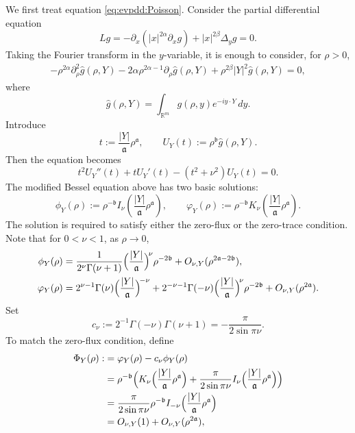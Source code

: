 \documentclass[12pt]{amsart}
\begin{document}
We first treat equation \eqref{eq:evpdd:Poisson}. Consider the partial differential equation
\begin{equation*}
    Lg = -\partial_x (|x|^{2\alpha}\partial_x g) + |x|^{2\beta} \Delta_y g = 0.
\end{equation*}
Taking the Fourier transform in the $y$-variable, it is enough to consider, for $\rho>0$,
\begin{align*}
    - \rho^{2\alpha} \partial_\rho^2 \hat{g}(\rho,Y) - 2\alpha \rho^{2\alpha-1} \partial_\rho \hat{g}(\rho,Y) + \rho^{2\beta} |Y|^2 \hat{g}(\rho,Y) = 0,
\end{align*}
where
\begin{equation*}
    \hat{g}(\rho,Y) = \int_{\mathbb{R}^m} g(\rho,y) e^{-i y \cdot Y} \, dy.
\end{equation*}
Introduce
\begin{equation*}
    t:= \frac{|Y|}{\mathfrak a} \rho^{\mathfrak a}, \qquad U_Y(t) := \rho^{\mathfrak b} \hat{g}(\rho, Y).
\end{equation*}
Then the equation becomes
\begin{equation*}
    t^2 U_Y''(t) + t U_Y'(t) - (t^2+\nu^2)U_Y(t) = 0.
\end{equation*}
The modified Bessel equation above has two basic solutions:
\begin{equation*}
    \phi_Y(\rho):=\rho^{-\mathfrak b} I_\nu\!\left( \frac{|Y|}{\mathfrak a} \rho^{\mathfrak a} \right), \qquad \varphi_Y(\rho):=\rho^{-\mathfrak b} K_\nu\!\left( \frac{|Y|}{\mathfrak a} \rho^{\mathfrak a} \right).
\end{equation*}
The solution is required to satisfy either the zero-flux or the zero-trace condition. Note that for $0<\nu<1$, as $\rho \to 0$,
\begin{align*}
\phi_Y(\rho) &= \frac{1}{2^\nu \Gamma(\nu+1)} \Bigl(\frac{|Y|}{\mathfrak a}\Bigr)^{\!\nu} \rho^{-2\mathfrak b} + O_{\nu,Y}(\rho^{2\mathfrak a - 2\mathfrak b}), \\
\varphi_Y(\rho) &= 2^{\nu-1} \Gamma(\nu) \Bigl(\frac{|Y|}{\mathfrak a}\Bigr)^{\!-\nu} + 2^{-\nu-1} \Gamma(-\nu) \Bigl(\frac{|Y|}{\mathfrak a}\Bigr)^{\!\nu} \rho^{-2\mathfrak b} + O_{\nu,Y}(\rho^{2\mathfrak a}).
\end{align*}
Set
\begin{equation*}
    c_\nu := 2^{-1} \Gamma(-\nu) \Gamma(\nu+1) = -\frac{\pi}{2\sin{\pi \nu}}.
\end{equation*}
To match the zero-flux condition, define
\begin{align*}
    \Phi_Y(\rho)
    :&= \varphi_Y(\rho) - c_\nu \phi_Y(\rho)\\
    &= \rho^{-\mathfrak b} \Bigl( K_\nu\Bigl(\frac{|Y|}{\mathfrak a}\rho^\mathfrak a \Bigr) + \frac{\pi}{2\sin{\pi \nu}} I_\nu \Bigl(\frac{|Y|}{\mathfrak a}\rho^\mathfrak a \Bigr) \Bigr)\\
    &= \frac{\pi}{2\sin{\pi \nu}} \rho^{-\mathfrak b} I_{-\nu}\Bigl(\frac{|Y|}{\mathfrak a}\rho^\mathfrak a\Bigr)\\
    &= O_{\nu,Y}(1) + O_{\nu,Y}(\rho^{2\mathfrak a}),
\end{align*}
\end{document}
